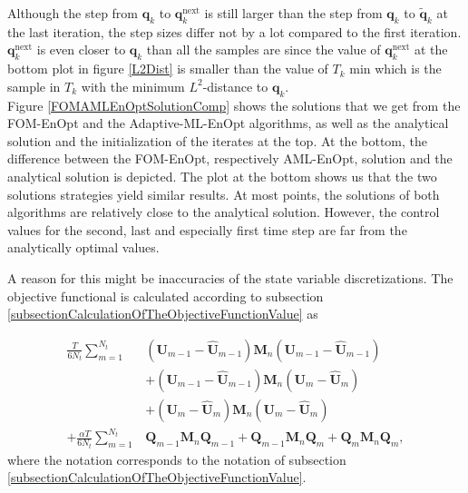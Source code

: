 Although the step from $\mathbf{q}_k$ to $\mathbf{q}^\mathrm{next}_k$ is still larger than the step from $\mathbf{q}_k$ to $\tilde{\mathbf{q}}_k$ at the last iteration, the step sizes differ not by a lot compared to the first iteration. $\mathbf{q}^\mathrm{next}_k$ is even closer to $\mathbf{q}_k$ than all the samples are since the value of $\mathbf{q}^\mathrm{next}_k$ at the bottom plot in figure \ref{L2Dist} is smaller than the value of $T_k$ min which is the sample in $T_k$ with the minimum $L^2$-distance to $\mathbf{q}_k$.\\

Figure \ref{FOMAMLEnOptSolutionComp} shows the solutions that we get from the FOM-EnOpt and the Adaptive-ML-EnOpt algorithms, as well as the analytical solution and the initialization of the iterates at the top. At the bottom, the difference between the FOM-EnOpt, respectively AML-EnOpt, solution and the analytical solution is depicted. The plot at the bottom shows us that the two solutions strategies yield similar results. At most points, the solutions of both algorithms are relatively close to the analytical solution. However, the control values for the second, last and especially first time step are far from the analytically optimal values.

A reason for this might be inaccuracies of the state variable discretizations. The objective functional is calculated according to subsection \ref{subsectionCalculationOfTheObjectiveFunctionValue} as

\begin{equation}
\label{discretizedObjectiveFunctionalRep}
\begin{aligned}
\frac{T}{6N_t}\sum_{m=1}^{N_t}&\left(\mathbf{U}_{m-1}-\hat{\mathbf{U}}_{m-1}\right)\mathbf{M}_n\left(\mathbf{U}_{m-1}-\hat{\mathbf{U}}_{m-1}\right)\\
&+ \left(\mathbf{U}_{m-1}-\hat{\mathbf{U}}_{m-1}\right)\mathbf{M}_n\left(\mathbf{U}_{m}-\hat{\mathbf{U}}_{m}\right)\\
&+ \left(\mathbf{U}_{m}-\hat{\mathbf{U}}_{m}\right)\mathbf{M}_n\left(\mathbf{U}_{m}-\hat{\mathbf{U}}_{m}\right)\\
+ \frac{\alpha T}{6N_t}\sum_{m=1}^{N_t}&\mathbf{Q}_{m-1}\mathbf{M}_n\mathbf{Q}_{m-1} + \mathbf{Q}_{m-1}\mathbf{M}_n\mathbf{Q}_{m} + \mathbf{Q}_{m}\mathbf{M}_n\mathbf{Q}_{m},
\end{aligned}
\end{equation}
where the notation corresponds to the notation of subsection \ref{subsectionCalculationOfTheObjectiveFunctionValue}.


